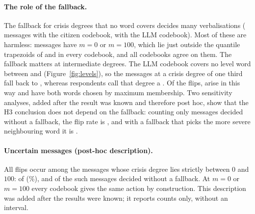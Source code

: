 \paragraph{The role of the fallback.}
The fallback for crisis degrees that no word covers decides many verbalisations (\WthreeNFallbackCitizen{} messages with
the citizen codebook, \WthreeNFallbackLlm{} with the LLM codebook).
Most of these are harmless: \WthreeNZeroOrHundred{} messages have $m = 0$ or $m = 100$, which lie just outside the
quantile trapezoids of  and  in every codebook, and all codebooks agree on them.
The fallback matters at intermediate degrees.
The LLM codebook covers no level word between \WthreeLlmGapLow{} and \WthreeLlmGapHigh{} (Figure~\ref{fig:levels}), so
the \WthreeNGapThreeThree{} messages at a crisis degree of one third fall back to , whereas respondents
call that degree a .
Of the \WthreeNFlips{} flips, \WthreeNFlipsFallback{} arise in this way and \WthreeNFlipsClean{} have both words chosen by
maximum membership.
Two sensitivity analyses, added after the result was known and therefore post hoc, show that the H3 conclusion does not depend on the fallback: counting only messages decided without a fallback, the flip rate is
\WthreePosthocANoFallbackItemsOnlyActionFlipRateLlmVsCitizenFull{}, and with a fallback that picks the more severe
neighbouring word it is \WthreePosthocBSevereNeighbourFallbackActionFlipRateLlmVsCitizenFull{}.

\paragraph{Uncertain messages (post-hoc description).}
All flips occur among the \WthreeNIntermediate{} messages whose crisis degree lies strictly between $0$ and $100$:
\WthreeNFlipsIntermediate{} of \WthreeNIntermediate{} (\WthreeFlipShareIntermediatePct{}\%), and
\WthreeNFlipsIntermediateClean{} of the \WthreeNIntermediateClean{} such messages decided without a fallback.
At $m = 0$ or $m = 100$ every codebook gives the same action by construction.
This description was added after the results were known; it reports counts only, without an interval.
